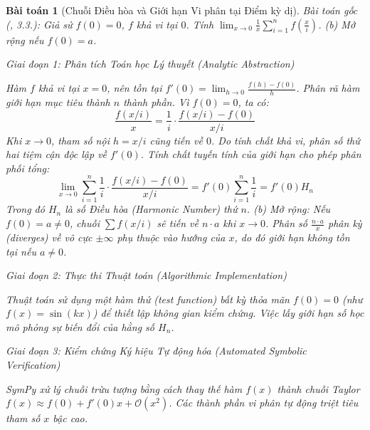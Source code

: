 \documentclass{article}
\newtheorem{baitoan}{Bài toán}
\begin{document}
\begin{baitoan}[Chuỗi Điều hòa và Giới hạn Vi phân tại Điểm kỳ dị]
 \emph{Bài toán gốc (\cite{Quoc_Long_Dat_Nam_VMC}, 3.3.):} 
 Giả sử $f(0) = 0$, $f$ khả vi tại $0$. Tính $\lim_{x\to0} \frac{1}{x}\sum_{i=1}^n f\left(\frac{x}{i}\right)$. (b) Mở rộng nếu $f(0) = a$.

\vspace{0.5em}\noindent\emph{Giai đoạn 1: Phân tích Toán học Lý thuyết (Analytic Abstraction)}
 
 Hàm $f$ khả vi tại $x=0$, nên tồn tại $f'(0) = \lim_{h\to0} \frac{f(h) - f(0)}{h}$. 
 Phân rã hàm giới hạn mục tiêu thành $n$ thành phần. Vì $f(0) = 0$, ta có:
 \begin{equation}
 \frac{f(x/i)}{x} = \frac{1}{i} \cdot \frac{f(x/i) - f(0)}{x/i}
 \end{equation}
 Khi $x \to 0$, tham số nội $h = x/i$ cũng tiến về $0$. Do tính chất khả vi, phân số thứ hai tiệm cận độc lập về $f'(0)$. Tính chất tuyến tính của giới hạn cho phép phân phối tổng:
 \begin{equation}
 \lim_{x\to0} \sum_{i=1}^n \frac{1}{i} \cdot \frac{f(x/i) - f(0)}{x/i} = f'(0) \sum_{i=1}^n \frac{1}{i} = f'(0) H_n
 \end{equation}
 Trong đó $H_n$ là số Điều hòa (Harmonic Number) thứ $n$.
 (b) Mở rộng: Nếu $f(0) = a \neq 0$, chuỗi $\sum f(x/i)$ sẽ tiến về $n \cdot a$ khi $x \to 0$. Phân số $\frac{n \cdot a}{x}$ phân kỳ (diverges) về vô cực $\pm \infty$ phụ thuộc vào hướng của $x$, do đó giới hạn không tồn tại nếu $a \neq 0$.

\vspace{0.5em}\noindent\emph{Giai đoạn 2: Thực thi Thuật toán (Algorithmic Implementation)}
 
 Thuật toán sử dụng một hàm thử (test function) bất kỳ thỏa mãn $f(0)=0$ (như $f(x) = \sin(kx)$) để thiết lập không gian kiểm chứng. Việc lấy giới hạn số học mô phỏng sự biến đổi của hằng số $H_n$.



\vspace{0.5em}\noindent\emph{Giai đoạn 3: Kiểm chứng Ký hiệu Tự động hóa (Automated Symbolic Verification)}
 
 \textsf{SymPy} xử lý chuỗi trừu tượng bằng cách thay thế hàm $f(x)$ thành chuỗi Taylor $f(x) \approx f(0) + f'(0)x + \mathcal{O}(x^2)$. Các thành phần vi phân tự động triệt tiêu tham số $x$ bậc cao.




\end{baitoan}
\end{document}
